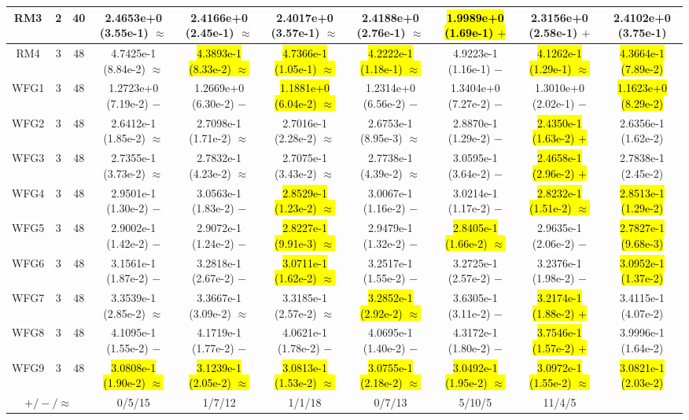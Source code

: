 \documentclass[journal]{IEEEtran}
\begin{document}
\begin{table*}[htbp]
\begin{tabular}{cccccccccc}
\hline
\multirow{1}{*}{RM3}&2&40&2.4653e+0 (3.55e-1) $\approx$&2.4166e+0 (2.45e-1) $\approx$&2.4017e+0 (3.57e-1) $\approx$&2.4188e+0 (2.76e-1) $\approx$&\hl{1.9989e+0 (1.69e-1) $+$}&2.3156e+0 (2.58e-1) $+$&2.4102e+0 (3.75e-1)\\
\hline
\multirow{1}{*}{RM4}&3&48&4.7425e-1 (8.84e-2) $\approx$&\hl{4.3893e-1 (8.33e-2) $\approx$}&\hl{4.7366e-1 (1.05e-1) $\approx$}&\hl{4.2222e-1 (1.18e-1) $\approx$}&4.9223e-1 (1.16e-1) $-$&\hl{4.1262e-1 (1.29e-1) $\approx$}&\hl{4.3664e-1 (7.89e-2)}\\
\hline
\multirow{1}{*}{WFG1}&3&48&1.2723e+0 (7.19e-2) $-$&1.2669e+0 (6.30e-2) $-$&\hl{1.1881e+0 (6.04e-2) $\approx$}&1.2314e+0 (6.56e-2) $-$&1.3404e+0 (7.27e-2) $-$&1.3010e+0 (2.02e-1) $-$&\hl{1.1623e+0 (8.29e-2)}\\
\hline
\multirow{1}{*}{WFG2}&3&48&2.6412e-1 (1.85e-2) $\approx$&2.7098e-1 (1.71e-2) $\approx$&2.7016e-1 (2.28e-2) $\approx$&2.6753e-1 (8.95e-3) $\approx$&2.8870e-1 (1.29e-2) $-$&\hl{2.4350e-1 (1.63e-2) $+$}&2.6356e-1 (1.62e-2)\\
\hline
\multirow{1}{*}{WFG3}&3&48&2.7355e-1 (3.73e-2) $\approx$&2.7832e-1 (4.23e-2) $\approx$&2.7075e-1 (3.43e-2) $\approx$&2.7738e-1 (4.39e-2) $\approx$&3.0595e-1 (3.64e-2) $-$&\hl{2.4658e-1 (2.96e-2) $+$}&2.7838e-1 (2.45e-2)\\
\hline
\multirow{1}{*}{WFG4}&3&48&2.9501e-1 (1.30e-2) $-$&3.0563e-1 (1.83e-2) $-$&\hl{2.8529e-1 (1.23e-2) $\approx$}&3.0067e-1 (1.16e-2) $-$&3.0214e-1 (1.17e-2) $-$&\hl{2.8232e-1 (1.51e-2) $\approx$}&\hl{2.8513e-1 (1.29e-2)}\\
\hline
\multirow{1}{*}{WFG5}&3&48&2.9002e-1 (1.42e-2) $-$&2.9072e-1 (1.24e-2) $-$&\hl{2.8227e-1 (9.91e-3) $\approx$}&2.9479e-1 (1.32e-2) $-$&\hl{2.8405e-1 (1.66e-2) $\approx$}&2.9635e-1 (2.06e-2) $-$&\hl{2.7827e-1 (9.68e-3)}\\
\hline
\multirow{1}{*}{WFG6}&3&48&3.1561e-1 (1.87e-2) $-$&3.2818e-1 (2.67e-2) $-$&\hl{3.0711e-1 (1.62e-2) $\approx$}&3.2517e-1 (1.55e-2) $-$&3.2725e-1 (2.57e-2) $-$&3.2376e-1 (1.98e-2) $-$&\hl{3.0952e-1 (1.37e-2)}\\
\hline
\multirow{1}{*}{WFG7}&3&48&3.3539e-1 (2.85e-2) $\approx$&3.3667e-1 (3.09e-2) $\approx$&3.3185e-1 (2.57e-2) $\approx$&\hl{3.2852e-1 (2.92e-2) $\approx$}&3.6305e-1 (3.11e-2) $-$&\hl{3.2174e-1 (1.88e-2) $+$}&3.4115e-1 (4.07e-2)\\
\hline
\multirow{1}{*}{WFG8}&3&48&4.1095e-1 (1.55e-2) $-$&4.1719e-1 (1.77e-2) $-$&4.0621e-1 (1.78e-2) $-$&4.0695e-1 (1.40e-2) $-$&4.3172e-1 (1.80e-2) $-$&\hl{3.7546e-1 (1.57e-2) $+$}&3.9996e-1 (1.64e-2)\\
\hline
\multirow{1}{*}{WFG9}&3&48&\hl{3.0808e-1 (1.90e-2) $\approx$}&\hl{3.1239e-1 (2.05e-2) $\approx$}&\hl{3.0813e-1 (1.53e-2) $\approx$}&\hl{3.0755e-1 (2.18e-2) $\approx$}&\hl{3.0492e-1 (1.95e-2) $\approx$}&\hl{3.0972e-1 (1.55e-2) $\approx$}&\hl{3.0821e-1 (2.03e-2)}\\
\hline
\multicolumn{3}{c}{$+/-/\approx$}&0/5/15&1/7/12&1/1/18&0/7/13&5/10/5&11/4/5&\\
\bottomrule
\end{tabular}
\label{No Label}
\end{table*}
\end{document}
